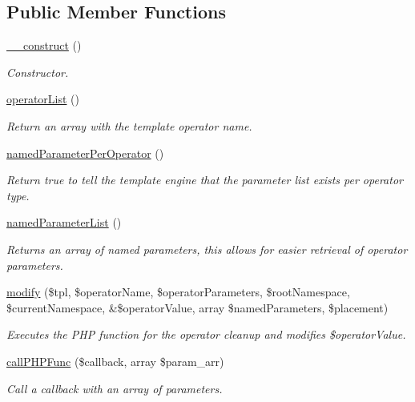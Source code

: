 \subsection*{Public Member Functions}
\begin{DoxyCompactItemize}
\item 
\hyperlink{classextension_1_1ezextrafeatures_1_1autoloads_1_1e_z_p_h_p_features_template_operators_a8c5738f682a394bba7d7b9b139ae1446}{\-\_\-\-\_\-construct} ()
\begin{DoxyCompactList}\small\item\em Constructor. \end{DoxyCompactList}\item 
\hyperlink{classextension_1_1ezextrafeatures_1_1autoloads_1_1e_z_p_h_p_features_template_operators_a60fba126c6d12467c28b1414f73a2fd3}{operator\-List} ()
\begin{DoxyCompactList}\small\item\em Return an array with the template operator name. \end{DoxyCompactList}\item 
\hyperlink{classextension_1_1ezextrafeatures_1_1autoloads_1_1e_z_p_h_p_features_template_operators_a91d08600b2001bb768f1a63977403686}{named\-Parameter\-Per\-Operator} ()
\begin{DoxyCompactList}\small\item\em Return true to tell the template engine that the parameter list exists per operator type. \end{DoxyCompactList}\item 
\hyperlink{classextension_1_1ezextrafeatures_1_1autoloads_1_1e_z_p_h_p_features_template_operators_ac196e247395f18394aad28854a65a51a}{named\-Parameter\-List} ()
\begin{DoxyCompactList}\small\item\em Returns an array of named parameters, this allows for easier retrieval of operator parameters. \end{DoxyCompactList}\item 
\hyperlink{classextension_1_1ezextrafeatures_1_1autoloads_1_1e_z_p_h_p_features_template_operators_a1635a1230f8a2e9e0703399bbc73303c}{modify} (\$tpl, \$operator\-Name, \$operator\-Parameters, \$root\-Namespace, \$current\-Namespace, \&\$operator\-Value, array \$named\-Parameters, \$placement)
\begin{DoxyCompactList}\small\item\em Executes the P\-H\-P function for the operator cleanup and modifies {\itshape \$operator\-Value\/}. \end{DoxyCompactList}\item 
\hyperlink{classextension_1_1ezextrafeatures_1_1autoloads_1_1e_z_p_h_p_features_template_operators_ad2342d56f12d6800eb4d22676065cfde}{call\-P\-H\-P\-Func} (\$callback, array \$param\-\_\-arr)
\begin{DoxyCompactList}\small\item\em Call a callback with an array of parameters. \end{DoxyCompactList}\end{DoxyCompactItemize}
